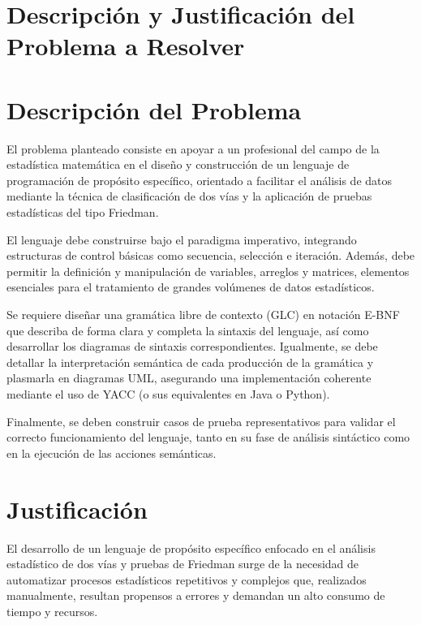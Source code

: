\documentclass{article}
\begin{document}

\section{Descripción y Justificación del Problema a Resolver}\label{sec:descr}

\section*{Descripción del Problema}

El problema planteado consiste en apoyar a un profesional del campo de la estadística matemática en el diseño y construcción de un lenguaje de programación de propósito específico, orientado a facilitar el análisis de datos mediante la técnica de clasificación de dos vías y la aplicación de pruebas estadísticas del tipo Friedman. 

El lenguaje debe construirse bajo el paradigma imperativo, integrando estructuras de control básicas como secuencia, selección e iteración. Además, debe permitir la definición y manipulación de variables, arreglos y matrices, elementos esenciales para el tratamiento de grandes volúmenes de datos estadísticos. 

Se requiere diseñar una gramática libre de contexto (GLC) en notación E-BNF que describa de forma clara y completa la sintaxis del lenguaje, así como desarrollar los diagramas de sintaxis correspondientes. Igualmente, se debe detallar la interpretación semántica de cada producción de la gramática y plasmarla en diagramas UML, asegurando una implementación coherente mediante el uso de YACC (o sus equivalentes en Java o Python).  

Finalmente, se deben construir casos de prueba representativos para validar el correcto funcionamiento del lenguaje, tanto en su fase de análisis sintáctico como en la ejecución de las acciones semánticas.

\section*{Justificación}

El desarrollo de un lenguaje de propósito específico enfocado en el análisis estadístico de dos vías y pruebas de Friedman surge de la necesidad de automatizar procesos estadísticos repetitivos y complejos que, realizados manualmente, resultan propensos a errores y demandan un alto consumo de tiempo y recursos.
\end{document}
